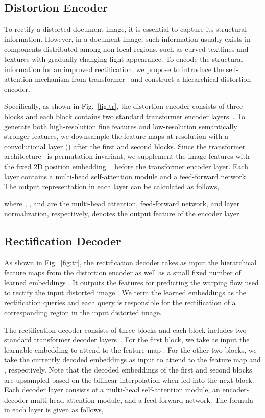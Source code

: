 \documentclass[lettersize,journal]{IEEEtran}
\begin{document}
\subsection{Distortion Encoder}
To rectify a distorted document image, it is essential to capture its structural information.
However, in a document image, such information usually exists in components distributed among non-local regions, such as curved textlines and textures with gradually changing light appearance.
To encode the structural information for an improved rectification,
we propose to introduce the self-attention mechanism from transformer~\cite{Vaswani2017AttentionIA} and construct a hierarchical distortion encoder.

Specifically, 
as shown in Fig.~\ref{fig:tr},
the distortion encoder consists of three blocks and each block contains two standard transformer encoder layers~\cite{Vaswani2017AttentionIA}.
To generate both high-resolution fine features and low-resolution semantically stronger features,
we downsample the feature maps at  resolution with a convolutional layer () after the first and second blocks.
Since the transformer architecture~\cite{Vaswani2017AttentionIA} is permutation-invariant,
we supplement the image features with the fixed 2D position embedding ~\cite{bello2019attention} before the transformer encoder layer.
Each layer contains a multi-head self-attention module and a feed-forward network.
The output representation in each layer can be calculated as follows,

where , , and  are the multi-head attention, feed-forward network, and layer normalization, respectively,
 denotes the output feature of the  encoder layer.

\subsection{Rectification Decoder}
As shown in Fig.~\ref{fig:tr}, the rectification decoder takes as input the hierarchical feature maps  from the distortion encoder as well as a
small fixed number of learned embeddings .
It outputs the features for predicting the warping flow  used to rectify the input distorted image .
We term the learned embeddings as the rectification queries and each query is responsible for the rectification of a corresponding region in the input distorted image.

The rectification decoder consists of three blocks and each block includes two standard transformer decoder layers~\cite{Vaswani2017AttentionIA}.
For the first block, we take as input the learnable embedding  to attend to the feature map .
For the other two blocks, we take the currently decoded embeddings as input to attend to the feature map  and , respectively.
Note that the decoded embeddings of the first and second blocks are upsampled based on the bilinear interpolation when fed into the next block.
Each decoder layer consists of a multi-head self-attention module, an encoder-decoder multi-head attention module, and a feed-forward network. The formula in each layer is given as follows,
\end{document}
